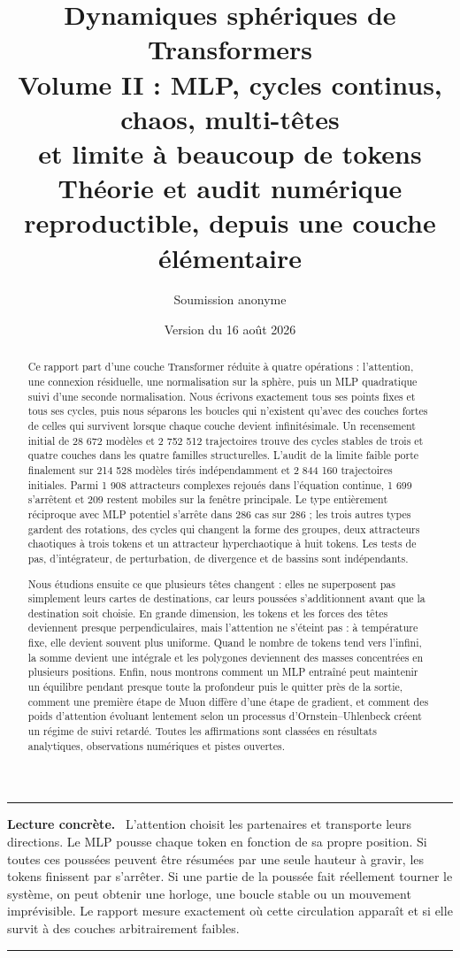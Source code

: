 \documentclass[11pt,a4paper]{article}
\title{\textbf{Dynamiques sphériques de Transformers}\\[0.25em]
\Large Volume II : MLP, cycles continus, chaos, multi-têtes\\
et limite à beaucoup de tokens\\[0.55em]
\large Théorie et audit numérique reproductible, depuis une couche élémentaire}
\author{Soumission anonyme}
\date{Version du 16 août 2026}
\theoremstyle{definition}
\newenvironment{plainbox}
{\begin{center}\begin{minipage}{0.92\textwidth}\color{deepblue}\hrule\vspace{0.45em}\small\textbf{Lecture concrète.}\ \color{black}}
{\vspace{0.35em}\color{deepblue}\hrule\color{black}\end{minipage}\end{center}}
\begin{document}
\maketitle

\begin{abstract}
Ce rapport part d'une couche Transformer réduite à quatre opérations : l'attention,
une connexion résiduelle, une normalisation sur la sphère, puis un MLP quadratique
suivi d'une seconde normalisation. Nous écrivons exactement tous ses points fixes et
tous ses cycles, puis nous séparons les boucles qui n'existent qu'avec des couches
fortes de celles qui survivent lorsque chaque couche devient infinitésimale. Un
recensement initial de 28 672 modèles et 2 752 512 trajectoires trouve des cycles
stables de trois et quatre couches dans les quatre familles structurelles. L'audit de
la limite faible porte finalement sur 214 528 modèles tirés indépendamment et
2 844 160 trajectoires initiales. Parmi 1 908 attracteurs complexes rejoués dans
l'équation continue, 1 699 s'arrêtent et 209 restent mobiles sur la fenêtre principale.
Le type entièrement réciproque avec MLP potentiel s'arrête dans 286 cas sur 286 ; les
trois autres types gardent des rotations, des cycles qui changent la forme des groupes,
deux attracteurs chaotiques à trois tokens et un attracteur hyperchaotique à huit
tokens. Les tests de pas, d'intégrateur, de perturbation, de divergence et de bassins
sont indépendants.

Nous étudions ensuite ce que plusieurs têtes changent : elles ne superposent pas
simplement leurs cartes de destinations, car leurs poussées s'additionnent avant que
la destination soit choisie. En grande dimension, les tokens et les forces des têtes
deviennent presque perpendiculaires, mais l'attention ne s'éteint pas : à température
fixe, elle devient souvent plus uniforme. Quand le nombre de tokens tend vers
l'infini, la somme devient une intégrale et les polygones deviennent des masses
concentrées en plusieurs positions. Enfin, nous montrons comment un MLP entraîné peut
maintenir un équilibre pendant presque toute la profondeur puis le quitter près de la
sortie, comment une première étape de Muon diffère d'une étape de gradient, et comment
des poids d'attention évoluant lentement selon un processus d'Ornstein--Uhlenbeck
créent un régime de suivi retardé. Toutes les affirmations sont classées en résultats
analytiques, observations numériques et pistes ouvertes.
\end{abstract}

\begin{plainbox}
L'attention choisit les partenaires et transporte leurs directions. Le MLP pousse
chaque token en fonction de sa propre position. Si toutes ces poussées peuvent être
résumées par une seule hauteur à gravir, les tokens finissent par s'arrêter. Si une
partie de la poussée fait réellement tourner le système, on peut obtenir une horloge,
une boucle stable ou un mouvement imprévisible. Le rapport mesure exactement où cette
circulation apparaît et si elle survit à des couches arbitrairement faibles.
\end{plainbox}
\end{document}
